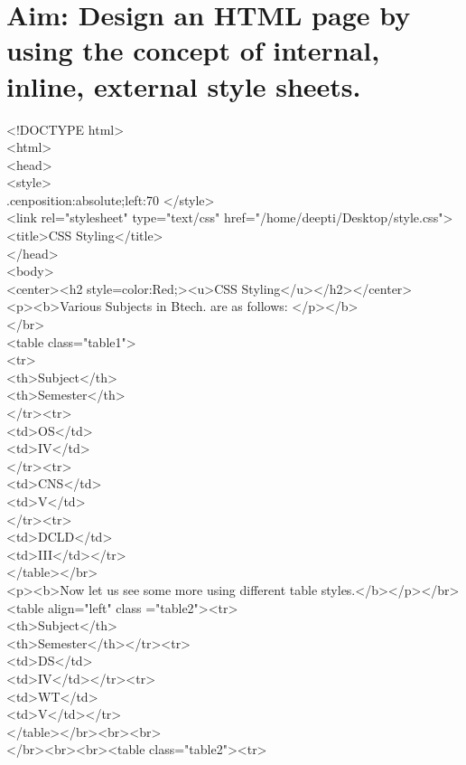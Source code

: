 \section*{\fontsize{16}{14}\selectfont Aim: Design an HTML page by using the concept of internal, inline, external style sheets.}
<!DOCTYPE html>\\
<html>\\
<head>\\
<style>\\
.cen{position:absolute;left:70%
</style>\\
<link rel="stylesheet" type="text/css" href="/home/deepti/Desktop/style.css">\\
<title>CSS Styling</title>\\
</head>\\
<body>\\
<center><h2 style=color:Red;><u>CSS Styling</u></h2></center>\\
<p><b>Various Subjects in Btech. are as follows: </p></b>\\
</br>\\
<table class="table1">\\
<tr>\\
<th>Subject</th>\\
<th>Semester</th>\\
</tr><tr>\\
<td>OS</td>\\
<td>IV</td>\\
</tr><tr>\\
<td>CNS</td>\\
<td>V</td>\\
</tr><tr>\\
<td>DCLD</td>\\
<td>III</td></tr>\\
</table></br>\\
<p><b>Now let us see some more using different table styles.</b></p></br>\\
<table align="left" class ="table2"><tr>\\
<th>Subject</th>\\
<th>Semester</th></tr><tr>\\
<td>DS</td>\\
<td>IV</td></tr><tr>\\
<td>WT</td>\\
<td>V</td></tr>\\
</table></br><br><br>\\
</br><br><br><table class="table2"><tr>\\
}
